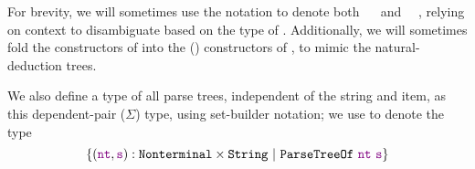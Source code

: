     For brevity, we will sometimes use the notation  to denote both ~~ and ~~, relying on context to disambiguate based on the type of .  Additionally, we will sometimes fold the constructors of  into the () constructors of , to mimic the natural-deduction trees.

    We also define a type of all parse trees, independent of the string and item, as this dependent-pair ($\Sigma$) type, using set-builder notation; we use  to denote the type
    $$\left\{\oftype{(\farg{nt}, \farg{s})}{\typeprod{\Nonterminal}{\String}}\ \middle|\ \indname{ParseTreeOf}~\farg{nt}~\farg{s}\right\}$$